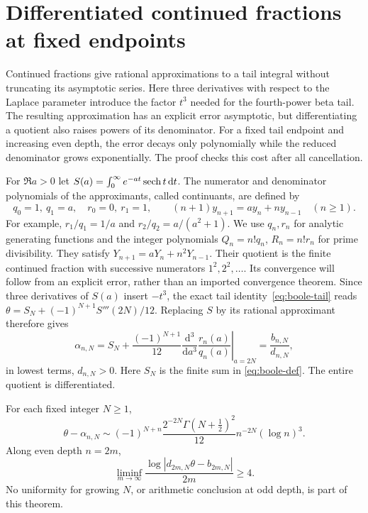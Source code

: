 \section{Differentiated continued fractions at fixed endpoints}\label{sec:cf}
Continued fractions give rational approximations to a tail integral
without truncating its asymptotic series. Here three derivatives with
respect to the Laplace parameter introduce the factor $t^3$ needed for
the fourth-power beta tail. The resulting approximation has an explicit
error asymptotic, but differentiating a quotient also raises powers of its
denominator. For a fixed tail endpoint and increasing even depth,
the error decays only polynomially while the reduced denominator grows
exponentially. The proof checks this cost after all cancellation.

For $\Re a>0$ let $S(a)=\int_0^\infty e^{-at}\operatorname{sech} t\,\mathrm d t$.
The numerator and denominator polynomials of the approximants,
called continuants, are defined by
\[
 q_0=1,\ q_1=a,\quad r_0=0,\ r_1=1,\qquad
 (n+1)y_{n+1}=ay_n+ny_{n-1}\quad(n\geq1).
\]
For example, $r_1/q_1=1/a$ and $r_2/q_2=a/(a^2+1)$.
We use $q_n,r_n$ for analytic generating functions and the integer
polynomials $Q_n=n!q_n$, $R_n=n!r_n$ for prime divisibility. They satisfy
$Y_{n+1}=aY_n+n^2Y_{n-1}$. Their quotient is the finite continued
fraction with successive numerators $1^2,2^2,\ldots$. Its convergence
will follow from an explicit error, rather than an imported convergence
theorem. Since three derivatives of $S(a)$ insert $-t^3$, the exact
tail identity~\eqref{eq:boole-tail} reads
$\theta=S_N+(-1)^{N+1}S'''(2N)/12$.
Replacing $S$ by its rational approximant therefore gives
\begin{equation}\label{eq:cf-approx}
 \alpha_{n,N}=S_N+\frac{(-1)^{N+1}}{12}
      \left.\frac{\mathrm d^3}{\mathrm da^3}\frac{r_n(a)}{q_n(a)}
      \right|_{a=2N}=\frac{b_{n,N}}{d_{n,N}},
\end{equation}
in lowest terms, $d_{n,N}>0$. Here $S_N$ is the finite sum in
\eqref{eq:boole-def}. The entire quotient is differentiated.

\begin{theorem}\label{thm:cf}
For each fixed integer $N\geq1$,
\begin{equation}\label{eq:cf-error}
 \theta-\alpha_{n,N}\sim(-1)^{N+n}
 \frac{2^{-2N}\Gamma(N+\tfrac12)^2}{12}
          n^{-2N}(\log n)^3.
\end{equation}
Along even depth $n=2m$,
\[
 \liminf_{m\to\infty}\frac{
       \log|d_{2m,N}\theta-b_{2m,N}|}{2m}\geq4.
\]
No uniformity for growing $N$, or arithmetic conclusion at odd depth,
is part of this theorem.
\end{theorem}

